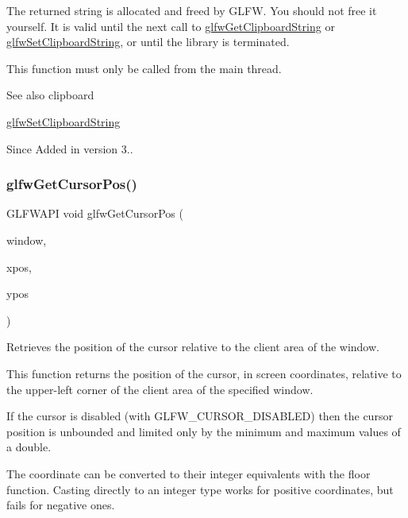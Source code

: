The returned string is allocated and freed by G\+L\+FW. You should not free it yourself. It is valid until the next call to \hyperlink{group__input_ga315b28b05797d00fe7cdf1ecfdc638dc}{glfw\+Get\+Clipboard\+String} or \hyperlink{group__input_ga7a580309bbc185a0459c3559021d2fd7}{glfw\+Set\+Clipboard\+String}, or until the library is terminated.

This function must only be called from the main thread.

\begin{DoxySeeAlso}{See also}
clipboard 

\hyperlink{group__input_ga7a580309bbc185a0459c3559021d2fd7}{glfw\+Set\+Clipboard\+String}
\end{DoxySeeAlso}
\begin{DoxySince}{Since}
Added in version 3.. 
\end{DoxySince}
\mbox{\label{group__input_gad289438eb7cf53d11eca685373f44105}} 
\subsubsection{\texorpdfstring{glfw\+Get\+Cursor\+Pos()}{glfwGetCursorPos()}}
{\footnotesize\ttfamily G\+L\+F\+W\+A\+PI void glfw\+Get\+Cursor\+Pos (\begin{DoxyParamCaption}\item[{\hyperlink{group__window_ga3c96d80d363e67d13a41b5d1821f3242}{G\+L\+F\+Wwindow} $\ast$}]{window,  }\item[{double $\ast$}]{xpos,  }\item[{double $\ast$}]{ypos }\end{DoxyParamCaption})}



Retrieves the position of the cursor relative to the client area of the window. 

This function returns the position of the cursor, in screen coordinates, relative to the upper-\/left corner of the client area of the specified window.

If the cursor is disabled (with {\ttfamily G\+L\+F\+W\+\_\+\+C\+U\+R\+S\+O\+R\+\_\+\+D\+I\+S\+A\+B\+L\+ED}) then the cursor position is unbounded and limited only by the minimum and maximum values of a {\ttfamily double}.

The coordinate can be converted to their integer equivalents with the {\ttfamily floor} function. Casting directly to an integer type works for positive coordinates, but fails for negative ones.

